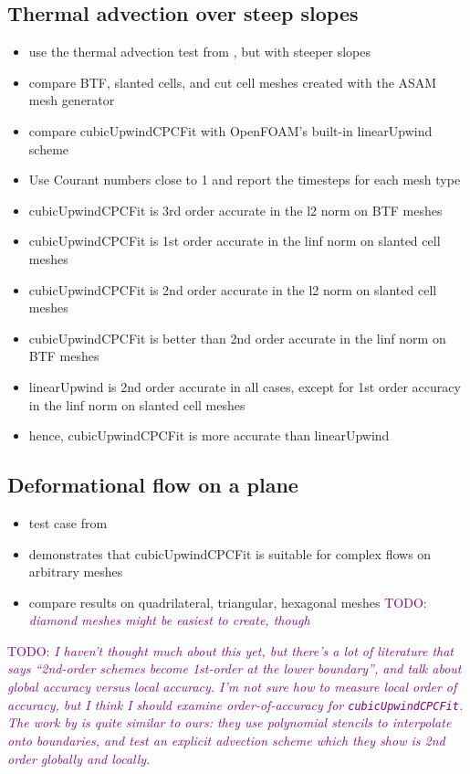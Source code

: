 \documentclass{article}
\newcommand{\TODO}[1]{\textcolor{purple}{TODO: \emph{#1}}}
\begin{document}
\subsection{Thermal advection over steep slopes}
\begin{itemize}
	\item use the thermal advection test from \citet{shaw-weller2016}, but with steeper slopes
	\item compare BTF, slanted cells, and cut cell meshes created with the ASAM mesh generator
	\item compare cubicUpwindCPCFit with OpenFOAM's built-in linearUpwind scheme
	\item Use Courant numbers close to 1 and report the timesteps for each mesh type
	\item cubicUpwindCPCFit is 3rd order accurate in the l2 norm on BTF meshes
	\item cubicUpwindCPCFit is 1st order accurate in the linf norm on slanted cell meshes
	\item cubicUpwindCPCFit is 2nd order accurate in the l2 norm on slanted cell meshes
	\item cubicUpwindCPCFit is better than 2nd order accurate in the linf norm on BTF meshes
	\item linearUpwind is 2nd order accurate in all cases, except for 1st order accuracy in the linf norm on slanted cell meshes
	\item hence, cubicUpwindCPCFit is more accurate than linearUpwind
\end{itemize}

\subsection{Deformational flow on a plane}
\begin{itemize}
	\item test case from \citet{lauritzen2012}
	\item demonstrates that cubicUpwindCPCFit is suitable for complex flows on arbitrary meshes
	\item compare results on quadrilateral, triangular, hexagonal meshes \TODO{diamond meshes might be easiest to create, though}
\end{itemize}

\TODO{I haven't thought much about this yet, but there's a lot of literature that says ``2nd-order schemes become 1st-order at the lower boundary'', and talk about global accuracy versus local accuracy.  I'm not sure how to measure local order of accuracy, but I think I should examine order-of-accuracy for \texttt{cubicUpwindCPCFit}.  The work by \citet{ye1999} is quite similar to ours: they use polynomial stencils to interpolate onto boundaries, and test an explicit advection scheme which they show is 2nd order globally and locally.}
\end{document}
